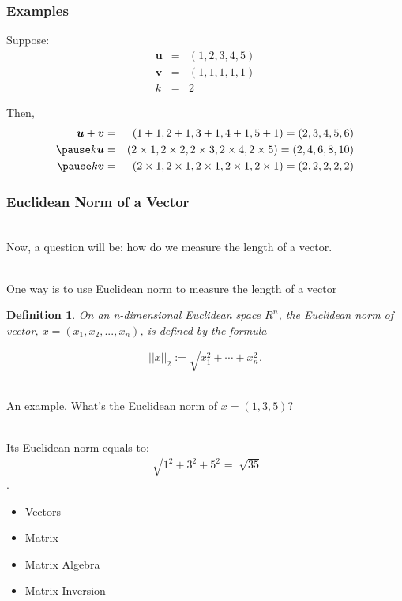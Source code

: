 \documentclass{beamer}
\newtheorem{defn}{Definition}
\numberwithin{equation}{section}
\begin{document}
\begin{frame}
\frametitle{Examples} 

Suppose:
\begin{eqnarray}
\boldsymbol{u} & = & (1, 2, 3, 4, 5) \nonumber \\
\boldsymbol{v} & = & (1, 1, 1, 1, 1) \nonumber \\
k & = & 2 \nonumber 
\end{eqnarray} \pause

Then, 
\begin{eqnarray}
\boldsymbol{u}  + \boldsymbol{v} & = & (1 + 1, 2 + 1, 3+ 1, 4 + 1, 5+ 1)  = (2, 3, 4, 5, 6)\nonumber \\ \pause
k \boldsymbol{u} & = & (2 \times 1, 2 \times 2, 2 \times 3, 2 \times 4, 2 \times 5) = (2, 4, 6, 8, 10) \nonumber \\ \pause
k \boldsymbol{v} & = & (2 \times 1,2 \times 1,2 \times 1,2 \times 1,2 \times 1) = (2, 2, 2, 2, 2) \nonumber 
\end{eqnarray}

\end{frame}



\begin{frame}
\frametitle{Euclidean Norm of a Vector}

\ \\Now, a question will be: how do we measure the length of a vector. \pause

\ \\One way is to use Euclidean norm to measure the length of a vector \pause

\begin{defn}
On an n-dimensional Euclidean space $R^{n}$, the Euclidean norm of vector, $x = (x_{1}, x_{2}, ..., x_{n})$, is defined by the formula

$$ ||x||_{2} :={\sqrt {x_{1}^{2} + \cdots + x_{n}^{2}}}. $$
\end{defn} \pause

\ \\An example. What's the Euclidean norm of $x = (1, 3, 5)$?

\ \\Its Euclidean norm equals to:
$$ \sqrt[]{1^{2} + 3^{2} + 5^{2}} = \sqrt[]{35}$$.

\end{frame}



\begin{frame}

\begin{itemize}
\item \textcolor{mygray}{Vectors}
\item \textcolor{myblack}{Matrix}
\item \textcolor{mygray}{Matrix Algebra}
\item \textcolor{mygray}{Matrix Inversion}
\end{itemize}

\end{frame}
\end{document}
